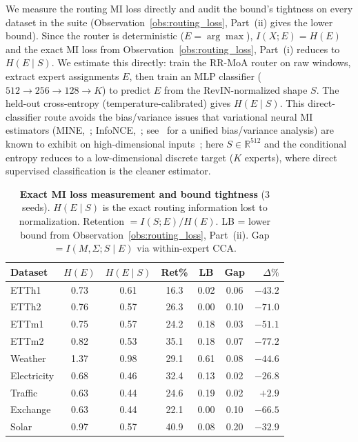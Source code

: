 \documentclass{article}
\begin{document}
We measure the routing MI loss directly and audit the bound's tightness on every dataset in the suite (Observation~\ref{obs:routing_loss}, Part~(ii) gives the lower bound). Since the router is deterministic ($E = \arg\max$), $I(X;E) = H(E)$ and the exact MI loss from Observation~\ref{obs:routing_loss}, Part~(i) reduces to $H(E \mid S)$. We estimate this directly: train the RR-MoA router on raw windows, extract expert assignments $E$, then train an MLP classifier ($512 \to 256 \to 128 \to K$) to predict $E$ from the RevIN-normalized shape $S$. The held-out cross-entropy (temperature-calibrated) gives $H(E \mid S)$. This direct-classifier route avoids the bias/variance issues that variational neural MI estimators (MINE,~\citealp{belghazi2018mine}; InfoNCE,~\citealp{oord2018cpc}; see~\citealp{poole2019variationalmi} for a unified bias/variance analysis) are known to exhibit on high-dimensional inputs~\citep{letizia2024fdiv,gowri2024latentmi}; here $S \in \mathbb{R}^{512}$ and the conditional entropy reduces to a low-dimensional discrete target ($K$ experts), where direct supervised classification is the cleaner estimator.

\begin{table}[!htbp]
\centering
\caption{\textbf{Exact MI loss measurement and bound tightness} (3 seeds). $H(E \mid S)$ is the exact routing information lost to normalization. Retention $= I(S;E)/H(E)$. LB = lower bound from Observation~\ref{obs:routing_loss}, Part~(ii). Gap $= I(M,\Sigma; S \mid E)$ via within-expert CCA.}
\label{tab:mi_tightness}
\small
\begin{tabular}{@{}lcccccr@{}}
\toprule
Dataset & $H(E)$ & $H(E \mid S)$ & Ret\% & LB & Gap & $\Delta\%$ \\
\midrule
ETTh1       & 0.73 & 0.61 & 16.3 & 0.02 & 0.06 & $-43.2$ \\
ETTh2       & 0.76 & 0.57 & 26.3 & 0.00 & 0.10 & $-71.0$ \\
ETTm1       & 0.75 & 0.57 & 24.2 & 0.18 & 0.03 & $-51.1$ \\
ETTm2       & 0.82 & 0.53 & 35.1 & 0.18 & 0.07 & $-77.2$ \\
Weather     & 1.37 & 0.98 & 29.1 & 0.61 & 0.08 & $-44.6$ \\
Electricity & 0.68 & 0.46 & 32.4 & 0.13 & 0.02 & $-26.8$ \\
Traffic     & 0.63 & 0.44 & 24.6 & 0.19 & 0.02 & $+2.9$ \\
Exchange    & 0.63 & 0.44 & 22.1 & 0.00 & 0.10 & $-66.5$ \\
Solar       & 0.97 & 0.57 & 40.9 & 0.08 & 0.20 & $-32.9$ \\
\bottomrule
\end{tabular}
\end{table}
\end{document}
